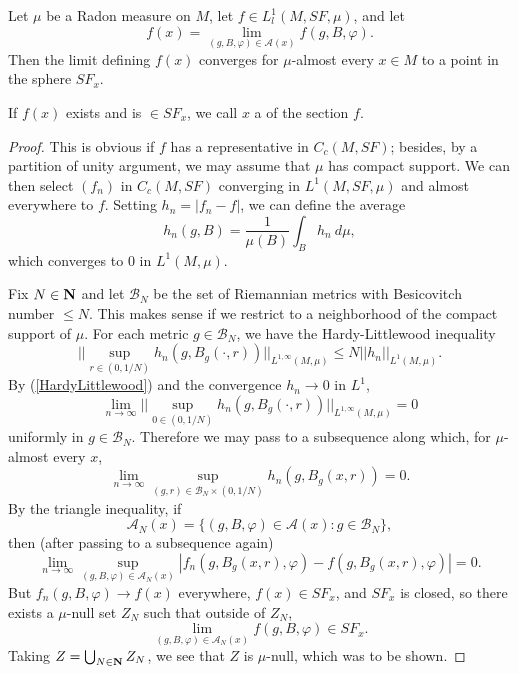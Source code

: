 \begin{proposition}\label{LebDiff}
Let $\mu$ be a Radon measure on $M$, let $f \in L^1_l(M, SF, \mu)$, and let
$$f(x) = \lim_{(g, B, \varphi) \in \mathcal A(x)} f(g, B, \varphi).$$
Then the limit defining $f(x)$ converges for $\mu$-almost every $x \in M$ to a point in the sphere $SF_x$.
\end{proposition}
If $f(x)$ exists and is $\in SF_x$, we call $x$ a  of the section $f$.
\begin{proof}
This is obvious if $f$ has a representative in $C_c(M, SF)$; besides, by a partition of unity argument, we may assume that $\mu$ has compact support.
We can then select $(f_n)$ in $C_c(M, SF)$ converging in $L^1(M, SF, \mu)$ and almost everywhere to $f$.
Setting $h_n = |f_n - f|$, we can define the average
$$h_n(g, B) = \frac{1}{\mu(B)} \int_B h_n ~d\mu,$$
which converges to $0$ in $L^1(M, \mu)$.

Fix $N \in \mathbf{N}$ and let $\mathcal B_N$ be the set of Riemannian metrics with Besicovitch number $\leq N$.
This makes sense if we restrict to a neighborhood of the compact support of $\mu$.
For each metric $g \in \mathcal B_N$, we have the Hardy-Littlewood inequality \cite[Lemma 4.1.1a]{Ledrappier85}
\begin{equation}\label{HardyLittlewood}
||\sup_{r \in (0, 1/N)} h_n(g, B_g(\cdot, r))||_{L^{1, \infty}(M, \mu)} \leq N ||h_n||_{L^1(M, \mu)}.
\end{equation}
By (\ref{HardyLittlewood}) and the convergence $h_n \to 0$ in $L^1$,
$$\lim_{n \to \infty} ||\sup_{0 \in (0, 1/N)} h_n(g, B_g(\cdot, r))||_{L^{1, \infty}(M, \mu)} = 0$$
uniformly in $g \in \mathcal B_N$.
Therefore we may pass to a subsequence along which, for $\mu$-almost every $x$,
$$\lim_{n \to \infty} \sup_{(g, r) \in \mathcal B_N \times (0, 1/N)} h_n(g, B_g(x, r)) = 0.$$
By the triangle inequality, if
$$\mathcal A_N(x) = \{(g, B, \varphi) \in \mathcal A(x): g \in \mathcal B_N\},$$
then (after passing to a subsequence again)
$$\lim_{n \to \infty} \sup_{(g, B, \varphi) \in \mathcal A_N(x)} |f_n(g, B_g(x, r), \varphi) - f(g, B_g(x, r), \varphi)| = 0.$$
But $f_n(g, B, \varphi) \to f(x)$ everywhere, $f(x) \in SF_x$, and $SF_x$ is closed, so there exists a $\mu$-null set $Z_N$ such that outside of $Z_N$,
$$\lim_{(g, B, \varphi) \in \mathcal A_N(x)} f(g, B, \varphi) \in SF_x.$$
Taking $Z = \bigcup_{N \in \mathbf{N}} Z_N$, we see that $Z$ is $\mu$-null, which was to be shown.
\end{proof}

